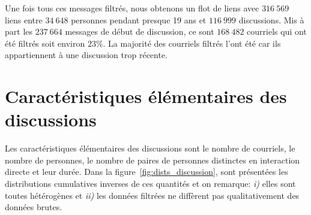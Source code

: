 Une fois tous ces messages filtrés, nous obtenons un flot de liens avec $316\ 569$ liens entre $34\ 648$ personnes pendant presque 19 ans et $116\ 999$ discussions.
Mis à part les $237\ 664$ messages de début de discussion, ce sont $168\ 482$ courriels qui ont été filtrés soit environ $23\%$.
La majorité des courriels filtrés l'ont été car ils appartiennent à une discussion trop récente.

\section{Caractéristiques élémentaires des discussions}

Les caractéristiques élémentaires des discussions sont le nombre de courriels, le nombre de personnes, le nombre de paires de personnes distinctes en interaction directe et leur durée.
Dans la figure~\ref{fig:dists_discussion}, sont présentées les distributions cumulatives inverses de ces quantités et on remarque: \emph{i)} elles sont toutes hétérogènes et \emph{ii)} les données filtrées ne diffèrent pas qualitativement des données brutes.

